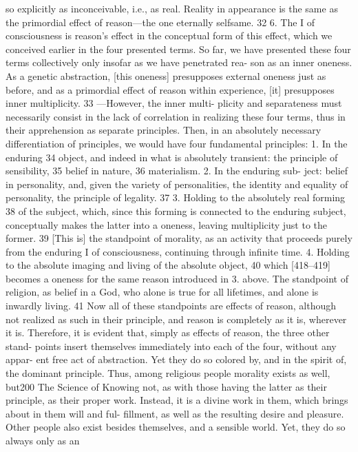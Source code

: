 so explicitly as inconceivable, i.e., as real. Reality in appearance is the same as
the primordial effect of reason—the one eternally selfsame. 32
6. The I of consciousness is reason’s effect in the conceptual form of this
effect, which we conceived earlier in the four presented terms. So far, we have
presented these four terms collectively only insofar as we have penetrated rea-
son as an inner oneness. As a genetic abstraction, [this oneness] presupposes
external oneness just as before, and as a primordial effect of reason within
experience, [it] presupposes inner multiplicity. 33 —However, the inner multi-
plicity and separateness must necessarily consist in the lack of correlation in
realizing these four terms, thus in their apprehension as separate principles.
Then, in an absolutely necessary differentiation of principles, we would have
four fundamental principles:
1. In the enduring 34 object, and indeed in what is absolutely transient: the
principle of sensibility, 35 belief in nature, 36 materialism. 2. In the enduring sub-
ject: belief in personality, and, given the variety of personalities, the identity
and equality of personality, the principle of legality. 37 3. Holding to the
absolutely real forming 38 of the subject, which, since this forming is connected
to the enduring subject, conceptually makes the latter into a oneness, leaving
multiplicity just to the former. 39 [This is] the standpoint of morality, as an
activity that proceeds purely from the enduring I of consciousness, continuing
through infinite time. 4. Holding to the absolute imaging and living of the
absolute object, 40 which [418–419] becomes a oneness for the same reason
introduced in 3. above. The standpoint of religion, as belief in a God, who
alone is true for all lifetimes, and alone is inwardly living. 41
Now all of these standpoints are effects of reason, although not realized
as such in their principle, and reason is completely as it is, wherever it is.
Therefore, it is evident that, simply as effects of reason, the three other stand-
points insert themselves immediately into each of the four, without any appar-
ent free act of abstraction. Yet they do so colored by, and in the spirit of, the
dominant principle. Thus, among religious people morality exists as well, but200
The Science of Knowing
not, as with those having the latter as their principle, as their proper work.
Instead, it is a divine work in them, which brings about in them will and ful-
fillment, as well as the resulting desire and pleasure. Other people also exist
besides themselves, and a sensible world. Yet, they do so always only as an
